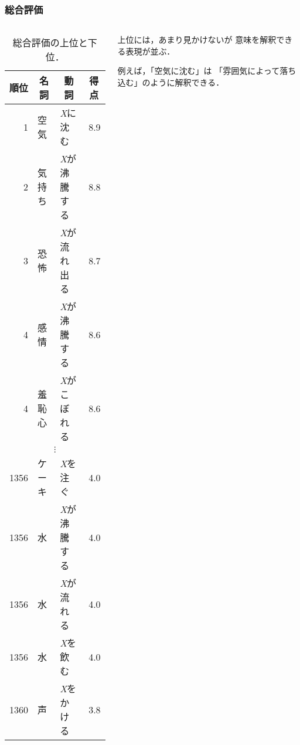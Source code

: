 \documentclass[12pt,usepdftitle=false]{beamer}
\newcommand\header[1]{\multicolumn{1}{c}{\textbf{#1}}}
\begin{document}
\begin{frame}
    \frametitle{総合評価}
    \begin{columns}
        \begin{column}{0.6\textwidth}
            \begin{table}[t]
                \centering\footnotesize
                \begin{tabular}{rllr}
                    \toprule%
                    \header{順位} & \header{名詞} & \header{動詞} & \header{得点} \\
                    \midrule%
                    1             & 空気          & \emph{X}に沈む       & 8.9           \\
                    2             & 気持ち        & \emph{X}が沸騰する   & 8.8           \\
                    3             & 恐怖          & \emph{X}が流れ出る   & 8.7           \\
                    4             & 感情          & \emph{X}が沸騰する   & 8.6           \\
                    4             & 羞恥心        & \emph{X}がこぼれる   & 8.6           \\
                    \multicolumn{4}{c}{$\vdots$} \\[2pt]
                    1356          & ケーキ        & \emph{X}を注ぐ       & 4.0           \\
                    1356          & 水            & \emph{X}が沸騰する   & 4.0           \\
                    1356          & 水            & \emph{X}が流れる     & 4.0           \\
                    1356          & 水            & \emph{X}を飲む       & 4.0           \\
                    1360          & 声            & \emph{X}をかける     & 3.8           \\
                    \bottomrule%
                \end{tabular}
                \caption{総合評価の上位と下位．}\label{tab:ranking}
            \end{table}
        \end{column}
        \begin{column}{0.4\textwidth}
            上位には，あまり見かけないが
            意味を解釈できる表現が並ぶ．

            \bigskip

            例えば，「空気に沈む」は
            「雰囲気によって落ち込む」のように解釈できる．
        \end{column}
    \end{columns}
\end{frame}
\end{document}

